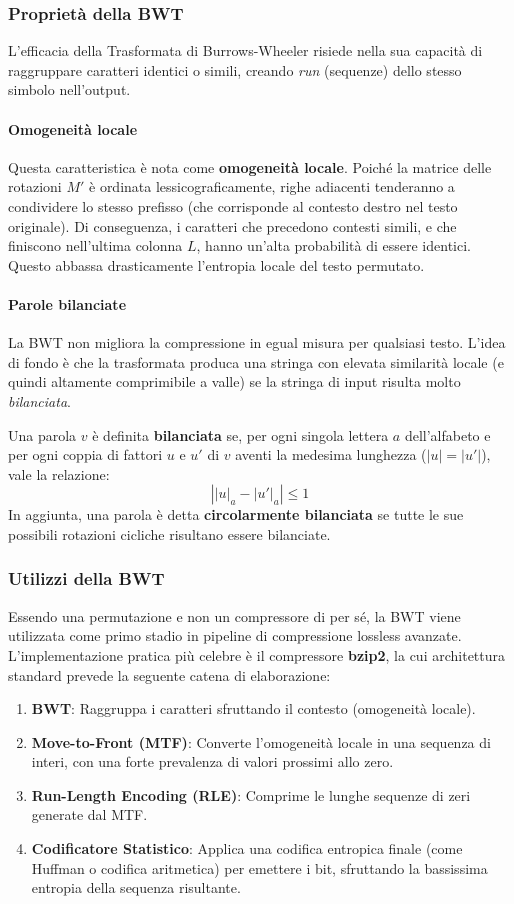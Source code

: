 \subsubsection{Proprietà della BWT}
L'efficacia della Trasformata di Burrows-Wheeler risiede nella sua capacità di raggruppare caratteri identici o simili, creando \textit{run} (sequenze) dello stesso simbolo nell'output. 

\paragraph{Omogeneità locale}
Questa caratteristica è nota come \textbf{omogeneità locale}. Poiché la matrice delle rotazioni $M'$ è ordinata lessicograficamente, righe adiacenti tenderanno a condividere lo stesso prefisso (che corrisponde al contesto destro nel testo originale). Di conseguenza, i caratteri che precedono contesti simili, e che finiscono nell'ultima colonna $L$, hanno un'alta probabilità di essere identici. Questo abbassa drasticamente l'entropia locale del testo permutato.

\paragraph{Parole bilanciate}
La BWT non migliora la compressione in egual misura per qualsiasi testo. L'idea di fondo è che la trasformata produca una stringa con elevata similarità locale (e quindi altamente comprimibile a valle) se la stringa di input risulta molto \textit{bilanciata}.

Una parola $v$ è definita \textbf{bilanciata} se, per ogni singola lettera $a$ dell'alfabeto e per ogni coppia di fattori $u$ e $u'$ di $v$ aventi la medesima lunghezza ($|u| = |u'|$), vale la relazione:
\[\left| |u|_a - |u'|_a \right| \le 1\]
In aggiunta, una parola è detta \textbf{circolarmente bilanciata} se tutte le sue possibili rotazioni cicliche risultano essere bilanciate.

\subsubsection{Utilizzi della BWT}
Essendo una permutazione e non un compressore di per sé, la BWT viene utilizzata come primo stadio in pipeline di compressione lossless avanzate. L'implementazione pratica più celebre è il compressore \textbf{bzip2}, la cui architettura standard prevede la seguente catena di elaborazione:
\begin{enumerate}
    \item \textbf{BWT}: Raggruppa i caratteri sfruttando il contesto (omogeneità locale).
    \item \textbf{Move-to-Front (MTF)}: Converte l'omogeneità locale in una sequenza di interi, con una forte prevalenza di valori prossimi allo zero.
    \item \textbf{Run-Length Encoding (RLE)}: Comprime le lunghe sequenze di zeri generate dal MTF.
    \item \textbf{Codificatore Statistico}: Applica una codifica entropica finale (come Huffman o codifica aritmetica) per emettere i bit, sfruttando la bassissima entropia della sequenza risultante.
\end{enumerate}

